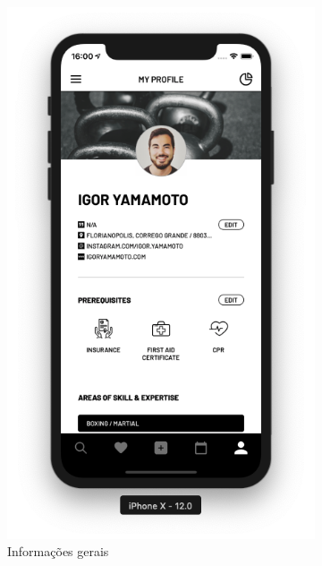 \begin{figure}[H]
	\centering
    \begin{subfigure}[b]{0.4\textwidth}
        \includegraphics[width=\textwidth]{pfc/figuras/tr-profile.png}
        \caption{Informações gerais}
        \label{fig:tr-profile-info}
    \end{subfigure}
    ~
	\begin{subfigure}[b]{0.4\textwidth}

\end{subfigure}
\end{figure}

